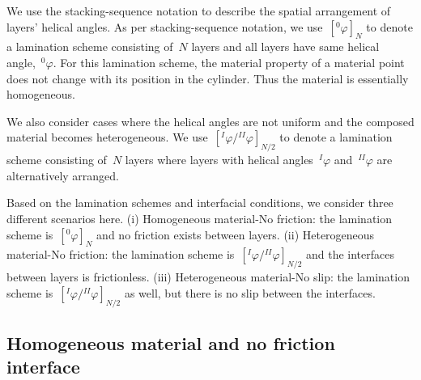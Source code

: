 \documentclass[preprint,10pt,times]{elsarticle}
\numberwithin{equation}{section}
\renewcommand{\>}{$\Rightarrow$}
\begin{document}
We use the stacking-sequence notation to describe the spatial arrangement of layers' helical angles. As per stacking-sequence notation, we use~$[{}^{0}\!\varphi]_N$ to denote a lamination scheme consisting of~$N$ layers and all layers have same helical angle,~${}^{0}\!\varphi$.
For this lamination scheme, the material property of a material point does not change with its position in the cylinder. Thus the material is essentially homogeneous.


We also consider cases where the helical angles are not uniform and the composed material becomes heterogeneous. We use~$[{}^{I}\!\varphi/{}^{II}\!\varphi]_{N/2}$ to denote a lamination scheme consisting of~$N$ layers where layers with helical angles~${}^{I}\!\varphi$ and~${}^{II}\!\varphi$ are alternatively arranged.

Based on the lamination schemes and interfacial conditions, we consider three different scenarios here. (i) Homogeneous material-No friction: the lamination scheme is~$[{}^{0}\!\varphi]_N$ and no friction exists between layers. (ii) Heterogeneous material-No friction: the lamination scheme is~$[{}^{I}\!\varphi/{}^{II}\!\varphi]_{N/2}$ and the interfaces between layers is frictionless. (iii) Heterogeneous material-No slip: the lamination scheme is~$[{}^{I}\!\varphi/{}^{II}\!\varphi]_{N/2}$ as well, but there is no slip between the interfaces.

\subsection{Homogeneous material and no friction interface}
\label{sec:1mat_no_friction}
\end{document}
